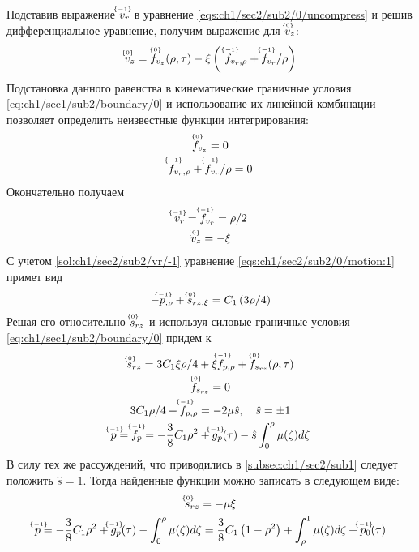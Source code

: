 Подставив выражение $\uindex{v}{-1}_{r}$ в уравнение \cref{eqs:ch1/sec2/sub2/0/uncompress} и решив дифференциальное уравнение, получим выражение для $\uindex{v}{0}_{z}$:
\begin{equation*}
  \uindex{v}{0}_{z} = \uindex{f}{0}_{v_{z}}(\rho, \tau) -\xi \left(\ \uindex{f}{-1}_{v_{r},\rho} + \uindex{f}{-1}_{v_{r}} / \rho\right)
\end{equation*}
Подстановка данного равенства в кинематические граничные условия \cref{eq:ch1/sec1/sub2/boundary/0} и использование их линейной комбинации позволяет определить неизвестные функции интегрирования:
\begin{gather*}
  \uindex{f}{0}_{v_{z}} = 0
  \\
  \uindex{f}{-1}_{v_{r},\rho} + \uindex{f}{-1}_{v_{r}} / \rho = 0
\end{gather*}
Окончательно получаем
\begin{gather}
  \label{sol:ch1/sec2/sub2/vr/-1}
  \uindex{v}{-1}_{r} = \uindex{f}{-1}_{v_{r}} = \rho / 2
  \\
  \label{sol:ch1/sec2/sub2/vz/0}
  \uindex{v}{0}_{z} =  -\xi
\end{gather}
С учетом \cref{sol:ch1/sec2/sub2/vr/-1} уравнение \cref{eqs:ch1/sec2/sub2/0/motion:1} примет вид
\begin{equation*}
  -\uindex{p}{-1}_{,\rho}+\uindex{s}{0}_{rz,\xi} = C_1 \left(3 \rho / 4\right)
\end{equation*}
Решая его относительно $\uindex{s}{0}_{rz}$ и используя силовые граничные условия \cref{eq:ch1/sec1/sub2/boundary/0} придем к
\begin{gather*}
  \uindex{s}{0}_{rz} = 3 C_1 \xi \rho / 4 + \xi \uindex{f}{-1}_{p,\rho} + \uindex{f}{0}_{s_{rz}}(\rho, \tau)
  \\
  \uindex{f}{0}_{s_{rz}} = 0
  \\
  3 C_1 \rho / 4 + \uindex{f}{-1}_{p,\rho} = -2 \mu \hat{s}, \quad \hat{s} = \pm 1
  \\
  \uindex{p}{-1} = \uindex{f}{-1}_{p} = - \frac{3}{8}C_1\rho^2 + \uindex{g}{-1}_{p}(\tau) - \hat{s} \int_0^\rho \mu(\zeta)d\zeta
\end{gather*}
В силу тех же рассуждений, что приводились в \ref{subsec:ch1/sec2/sub1} следует положить $\hat{s} = 1$. Тогда найденные функции можно записать в следующем виде:
\begin{gather}
  \label{sol:ch1/sec2/sub2/srz/0}
  \uindex{s}{0}_{rz} = -\mu \xi
  \\
  \label{sol:ch1/sec2/sub2/p/-1}
  \uindex{p}{-1} = - \frac{3}{8}C_1\rho^2 + \uindex{g}{-1}_{p}(\tau) - \int_0^\rho \mu(\zeta)d\zeta = \frac{3}{8}C_1\left(1-\rho^2\right) + \int_\rho^1 \mu(\zeta)d\zeta + \uindex{p}{-1}_{0}(\tau)
\end{gather}
